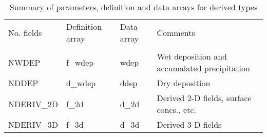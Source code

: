    \begin{table}[h]
   \caption{Summary of parameters, definition and data arrays for derived types}
   \label{TABDRV}
   \begin{tabular}{|lllp{6cm}|}\hline
     No. fields    &  Definition array & Data array  & Comments  \\
                   &               &                 &           \\
     NWDEP         &    f\_wdep    &    wdep   & Wet deposition and accumalated precipitation  \\
     NDDEP         &    d\_wdep    &    ddep   & Dry deposition   \\
     NDERIV\_2D     &    f\_2d      &    d\_2d   & Derived 2-D fields, surface concs., etc.  \\
     NDERIV\_3D     &    f\_3d      &    d\_3d   & Derived 3-D fields  \\ \hline
   \end{tabular}
   \end{table}
